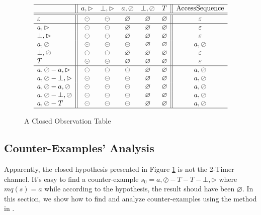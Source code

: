 \documentclass[conference, a4paper]{IEEEtran}
\newcommand{\rblock}[0]{\circleddash}
\newcommand{\rread}[0]{\rhd}
\newcommand{\rnoread}[0]{\oslash}
\newcommand{\rempty}[0]{\varnothing}
\begin{document}
\begin{figure}[ht]
  \begin{center}
    \begin{small}
      \begin{displaymath}
        \begin{array}{l||ccccc||c}
          \hline
          & a,\rread & \bot,\rread & a,\rnoread & \bot,\rnoread & T & \mbox{AccessSequence}\\
          \hline\hline
          \varepsilon & \rblock & \rblock & \rempty & \rempty & \rempty & \varepsilon \\
          \hline
          a,\rread & \rblock & \rblock & \rempty & \rempty & \rempty & \varepsilon\\
          \bot,\rread & \rblock & \rblock & \rempty & \rempty & \rempty & \varepsilon \\
          a,\rnoread & \rblock & \rblock & \rblock & \rempty & \rempty & a,\rnoread \\
          \bot,\rnoread & \rblock & \rblock & \rempty & \rempty & \rempty & \varepsilon \\
          T & \rblock & \rblock & \rempty & \rempty & \rempty & \varepsilon \\
          \hline
          a,\rnoread-a,\rread & \rblock & \rblock & \rblock & \rempty & \rempty & a,\rnoread \\
          a,\rnoread-\bot,\rread & \rblock & \rblock & \rblock & \rempty & \rempty & a,\rnoread \\
          a,\rnoread-a,\rnoread & \rblock & \rblock & \rblock & \rempty & \rempty & a,\rnoread \\
          a,\rnoread-\bot,\rnoread & \rblock & \rblock & \rblock & \rempty & \rempty & a,\rnoread \\
          a,\rnoread-T & \rblock & \rblock & \rblock & \rempty & \rempty & a,\rnoread \\
          \hline
        \end{array}
      \end{displaymath}
    \end{small}
  \end{center}
  \caption{A Closed Observation Table}
  \label{fig:hypo2}
\end{figure}

\subsection{Counter-Examples' Analysis} 
Apparently, the closed hypothesis presented in Figure \ref{fig:hypo2} is not the 2-Timer
channel. It's easy to find a counter-example $s_0=a,\rnoread-T-T-\bot,\rread$ where $mq(s)=a$ while
according to the hypothesis, the result shoud have been $\rempty$. In this section, we show how to
find and analyze counter-examples using the method in \cite{DBLP:conf/sfm/SteffenHM11}. 
\end{document}
